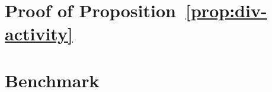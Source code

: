 
\appendix

\section{Proof of Proposition~\ref{prop:div-activity}}\label{ap:div-activity}




%

\section{Benchmark}\label{ap:benchmark}




%
